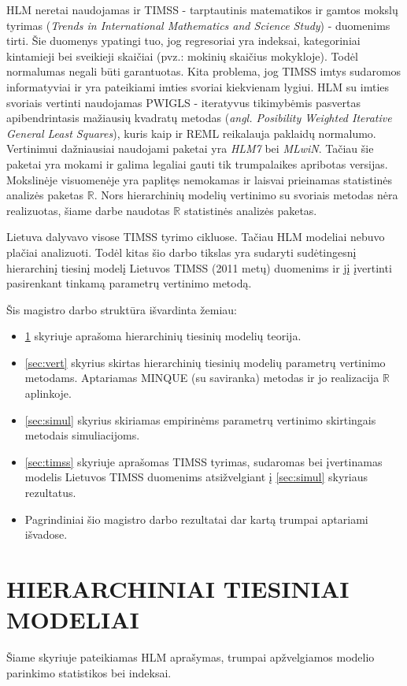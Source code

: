 \documentclass[12pt,a4paper]{article}
\newcommand{\R}{{\mathbb R}}
\begin{document}
\indent HLM neretai naudojamas ir TIMSS - tarptautinis matematikos ir gamtos mokslų tyrimas (\textit{Trends in International Mathematics and Science Study}) - duomenims tirti. Šie duomenys ypatingi tuo, jog regresoriai yra indeksai, kategoriniai kintamieji bei sveikieji skaičiai (pvz.: mokinių skaičius mokykloje). Todėl normalumas negali būti garantuotas. Kita problema, jog TIMSS imtys sudaromos informatyviai ir yra pateikiami imties svoriai kiekvienam lygiui. HLM su imties svoriais vertinti naudojamas PWIGLS - iteratyvus tikimybėmis pasvertas apibendrintasis mažiausių kvadratų metodas (\textit{angl. Posibility Weighted Iterative General Least Squares}), kuris kaip ir REML reikalauja paklaidų normalumo. Vertinimui dažniausiai naudojami paketai yra \textit{HLM7} bei \textit{MLwiN}. Tačiau šie paketai yra mokami ir galima legaliai gauti tik trumpalaikes apribotas versijas. Mokslinėje visuomenėje yra paplitęs nemokamas ir laisvai prieinamas statistinės analizės paketas $\R$. Nors hierarchinių modelių vertinimo su svoriais metodas nėra realizuotas, šiame darbe naudotas $\R$ statistinės analizės paketas.

\indent Lietuva dalyvavo visose TIMSS tyrimo cikluose. Tačiau HLM modeliai nebuvo plačiai analizuoti. Todėl kitas šio darbo tikslas yra sudaryti sudėtingesnį hierarchinį tiesinį modelį Lietuvos TIMSS (2011 metų) duomenims ir jį įvertinti pasirenkant tinkamą parametrų vertinimo metodą.

\indent Šis magistro darbo struktūra išvardinta žemiau:
\begin{itemize}
\item \ref{sec:hlm} skyriuje aprašoma hierarchinių tiesinių modelių teorija.
\item \ref{sec:vert} skyrius skirtas hierarchinių tiesinių modelių parametrų vertinimo metodams. Aptariamas MINQUE (su saviranka) metodas ir jo realizacija $\R$ aplinkoje.
\item \ref{sec:simul} skyrius skiriamas empirinėms parametrų vertinimo skirtingais metodais simuliacijoms.
\item \ref{sec:timss} skyriuje aprašomas TIMSS tyrimas, sudaromas bei įvertinamas modelis Lietuvos TIMSS duomenims atsižvelgiant į \ref{sec:simul} skyriaus rezultatus.
\item Pagrindiniai šio magistro darbo rezultatai dar kartą trumpai aptariami išvadose.
\end{itemize}

\newpage
\section{HIERARCHINIAI TIESINIAI MODELIAI} \label{sec:hlm}
\indent Šiame skyriuje pateikiamas HLM aprašymas, trumpai apžvelgiamos modelio parinkimo statistikos bei indeksai.
\end{document}
